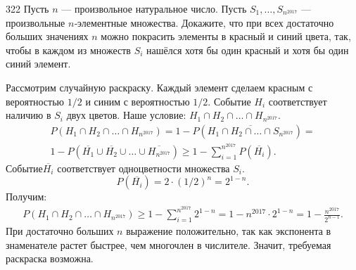 \begin{task}{322}
Пусть 
$n$ — произвольное натуральное число. Пусть $S_1, \dots, S_{n^{2017}}$ — произвольные $n$‑элементные множества. Докажите, что при всех достаточно больших значениях $n$ можно покрасить элементы в красный и синий цвета, так, чтобы в каждом из множеств $S_i$ нашёлся хотя бы один красный и хотя бы один синий элемент.
\end{task}

\begin{solution}
Рассмотрим случайную раскраску. Каждый элемент сделаем красным с вероятностью $1/2$ и синим с вероятностью $1/2$. Событие $H_i$ соответствует наличию в $S_i$ двух цветов. Наше условие: $H_1 \cap H_2 \cap \dots \cap H_{n^{2017}}$.
\begin{multline*}
P(H_1 \cap H_2 \cap \dots \cap H_{n^{2017}}) = 1 - P(\overline{H_1 \cap H_2 \cap \dots \cap S_{n^{2017}}}) =\\ 1 - P(\overline{H_1} \cup \overline{H_2} \cup \dots \cup \overline{H_{n^{2017}}}) \geq 1 - \sum\limits_{i=1}^{{n}^{2017}} P(\overline{H_i}).
\end{multline*}
$Событие \overline{H_i}$ соответствует одноцветности множества $S_i$. 
\[P(\overline{H_i}) = 2\cdot(1/2)^n = 2^{1-n}.\]
Получим:
\begin{gather*}
P(H_1 \cap H_2 \cap \dots \cap H_{n^{2017}}) \geq 1 - \sum\limits_{i=1}^{{n}^{2017}} 2^{1-n} = 1-n^{2017}\cdot2^{1-n} = 1 - \frac{n^{2017}}{2^{n - 1}}.
\end{gather*}
При достаточно больших $n$ выражение положительно, так как экспонента в знаменателе растет быстрее, чем многочлен в числителе. Значит, требуемая раскраска возможна.\end{solution}
